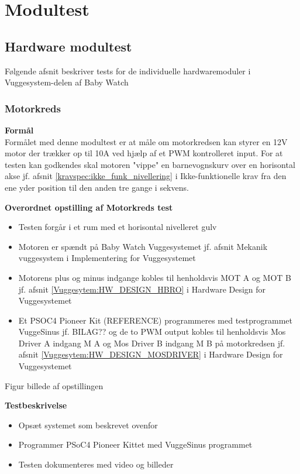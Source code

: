 \section{Modultest}
\subsection{Hardware modultest}
Følgende afsnit beskriver tests for de individuelle hardwaremoduler i Vuggesystem-delen af Baby Watch
\subsubsection{Motorkreds}
\textbf{Formål} \\
Formålet med denne modultest er at måle om motorkredsen kan styrer en 12V motor der trækker op til 10A ved hjælp af et PWM kontrolleret input. For at testen kan godkendes skal motoren "vippe" en barnevognskurv over en horisontal akse jf. afsnit \ref{kravspec:ikke_funk_nivellering} i Ikke-funktionelle krav fra den ene yder position til den anden tre gange i sekvens.

\textbf{Overordnet opstilling af Motorkreds test}

\begin{itemize}
	\item Testen forgår i et rum med et horisontal nivelleret gulv
	\item Motoren er spændt på Baby Watch Vuggesystemet jf. afsnit Mekanik vuggesystem i Implementering for Vuggesystemet
	\item Motorens plus og minus indgange kobles til henholdsvis MOT A og MOT B jf. afsnit \ref{Vuggesytem:HW_DESIGN_HBRO} i Hardware Design for Vuggesystemet
	\item Et PSOC4 Pioneer Kit (REFERENCE) programmeres med testprogrammet VuggeSinus jf. BILAG?? og de to PWM output kobles til henholdsvis Mos Driver A indgang M A og Mos Driver B indgang M B på motorkredsen jf. afsnit \ref{Vuggesytem:HW_DESIGN_MOSDRIVER} i Hardware Design for Vuggesystemet
\end{itemize}

Figur billede af opstillingen

\textbf{Testbeskrivelse}
\begin{itemize}
	\item Opsæt systemet som beskrevet ovenfor
	\item Programmer PSoC4 Pioneer Kittet med VuggeSinus programmet
	\item Testen dokumenteres med video og billeder
\end{itemize}

